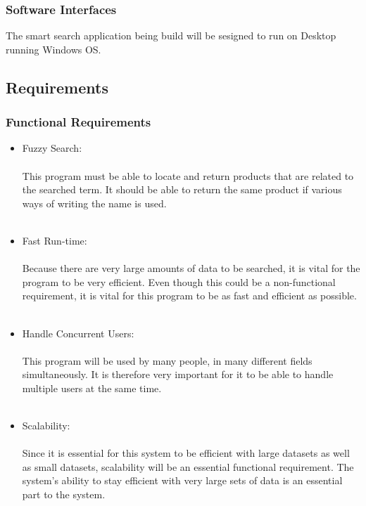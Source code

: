\documentclass[a4paper,10pt]{article}
\begin{document}
{                 \subsubsection{Software Interfaces}
The smart search application being build will be sesigned to run on Desktop running Windows OS.

	\subsection{Requirements}
	\subsubsection{Functional Requirements} 
		\begin{itemize}
		\item Fuzzy Search:\\\\
			This program must be able to locate and return products that are related to the searched term. It should be able to return the same product if various ways of writing the name is used.\\\\
	
		\item Fast Run-time:\\\\
			Because there are very large amounts of data to be searched, it is vital for the program to be very efficient.  Even though this could be a non-functional requirement, it is vital for this program to be as fast and efficient as possible.\\\\
	
		\item Handle Concurrent Users:\\\\
			This program will be used by many people, in many different fields simultaneously. It is therefore very important for it to be able to handle multiple users at the same time.\\\\
	
		\item Scalability:\\\\
			Since it is essential for this system to be efficient with large datasets as well as small datasets, scalability will be an essential functional requirement. The system’s ability to stay efficient with very large sets of data is an essential part to the system.
		 \end{itemize}

}
\end{document}
